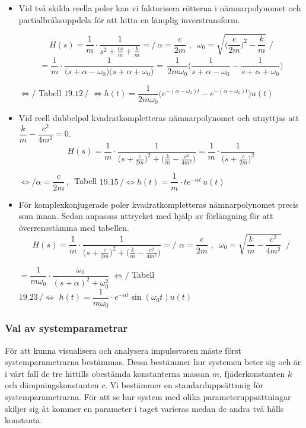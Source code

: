 \begin{itemize}
    \item Vid två skilda reella poler kan vi faktorisera rötterna i nämnarpolynomet och partialbråksuppdela för att hitta en lämplig inverstransform.
    
    $$H(s)=\frac{1}{m} \cdot \frac{1}{s^2+\frac{cs}{m}+\frac{k}{m}}=\Bigg/ \,\alpha=\frac{c}{2m}\,\,,\,\,\, \omega_0=\sqrt{\bigg(\frac{c}{2m}\bigg)^2-\frac{k}{m}} \,\,\Bigg/$$
    $$=\frac{1}{m} \cdot \frac{1}{\big(s+\alpha-\omega_0\big)\big(s+\alpha+\omega_0\big)}  = \, \frac{1}{2m\omega_0} \Bigg(\frac{1}{s+\alpha-\omega_0}-\frac{1}{s+\alpha+\omega_0}\Bigg)$$
    \begin{center}$ \Longleftrightarrow \bigg/$ Tabell $19.12\,\bigg/$ 
    $\Longleftrightarrow h(t)=\dfrac{1}{2m\omega_0}\bigg(e^{-(\alpha-\omega_0)t}-e^{-(\alpha+\omega_0)t}\bigg)u(t)$ \end{center}
    
    \item Vid reell dubbelpol kvadratkompletteras nämnarpolynomet och utnyttjas att
    $\dfrac{k}{m}-\dfrac{c^2}{4m^2}=0$.
    $$ H(s)= \frac{1}{m} \cdot\frac{1}{\big(s+\frac{c}{2m}\big)^2+\big(\frac{k}{m}-\frac{c^2}{4m^2}\big)} = \frac{1}{m} \cdot \frac{1}{\big(s+\frac{c}{2m}\big)^2}$$
    \begin{center}
    $ \Longleftrightarrow \bigg/ \alpha=\dfrac{c}{2m}\,,\,$ Tabell $19.15\,\bigg/ \Longleftrightarrow h(t)=\dfrac{1}{m} \cdot te^{-\alpha t}\,u(t)$
    \end{center}
    
    \item För komplexkonjugerade poler kvadratkompletteras nämnarpolynomet precis som innan. Sedan anpassas uttrycket med hjälp av förlängning för att överrensstämma med tabellen.
    $$H(s)=\frac{1}{m} \cdot \frac{1}{\big(s+\frac{c}{2m}\big)^2+\big(\frac{k}{m}-\frac{c^2}{4m^2}\big)} = \Bigg/\, \,\alpha=\frac{c}{2m}\,\,,\,\,\,\omega_0=\sqrt{\frac{k}{m}-\frac{c^2}{4m^2}} \,\,\,\Bigg/ $$
    \begin{center}
    $=\dfrac{1}{m\omega_0} \cdot \dfrac{\omega_0}{(s+\alpha)^2+\omega_0^2} \,\,\Longleftrightarrow \bigg/$ Tabell $19.23\,\bigg/\Longleftrightarrow\,\, h(t)=\dfrac{1}{m\omega_0} \cdot e^{-\alpha t} \sin(\omega_0 t)u(t)$
    \end{center}
\end{itemize}

\subsubsection{Val av systemparametrar}
För att kunna visualisera och analysera impulssvaren måste först systemparametrarna bestämmas. Dessa bestämmer hur systemen beter sig och är i vårt fall de tre hittills obestämda konstanterna massan  $m$, fjäderkonstanten $k$ och dämpningskonstanten $c$. Vi bestämmer en standarduppsättnnig för systemparametrarna. För att se hur system med olika parameteruppsättningar skiljer sig åt kommer en parameter i taget varieras medan de andra två hålls konstanta.

